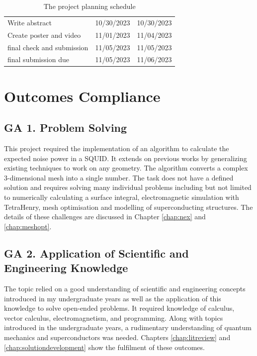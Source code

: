 \begin{table}[H]
\begin{tabular}{lll}
        Write abstract                                       & 10/30/2023          & 10/30/2023        \\
        Create poster and video                              & 11/01/2023          & 11/04/2023        \\
        final check and submission                           & 11/05/2023          & 11/05/2023        \\
        final submission due                                 & 11/05/2023          & 11/06/2023        \\ \hline
        \end{tabular}
        \caption{The project planning schedule}
        \label{tab:pps}
    \end{table}


\chapter{Outcomes Compliance}
\makeatletter{}\makeatother
\label{appen:OC}

\section{GA 1. Problem Solving}
This project required the implementation of an algorithm to calculate the expected noise power in a SQUID. It extends on previous works by generalizing existing techniques to work on any geometry. The algorithm converts a complex 3-dimensional mesh into a single number. The task does not have a defined solution and requires solving many individual problems including but not limited to numerically calculating a surface integral, electromagnetic simulation with TetraHenry, mesh optimisation and modelling of superconducting structures. The details of these challenges are discussed in Chapter \ref{chap:nex} and \ref{chap:meshopt}.

\section{GA 2. Application of Scientific and Engineering Knowledge}
The topic relied on a good understanding of scientific and engineering concepts introduced in my undergraduate years as well as the application of this knowledge to solve open-ended problems. It required knowledge of calculus, vector calculus, electromagnetism, and programming. Along with topics introduced in the undergraduate years, a rudimentary understanding of quantum mechanics and superconductors was needed. Chapters \ref{chap:litreview} and \ref{chap:solutiondevelopment} show the fulfilment of these outcomes.
